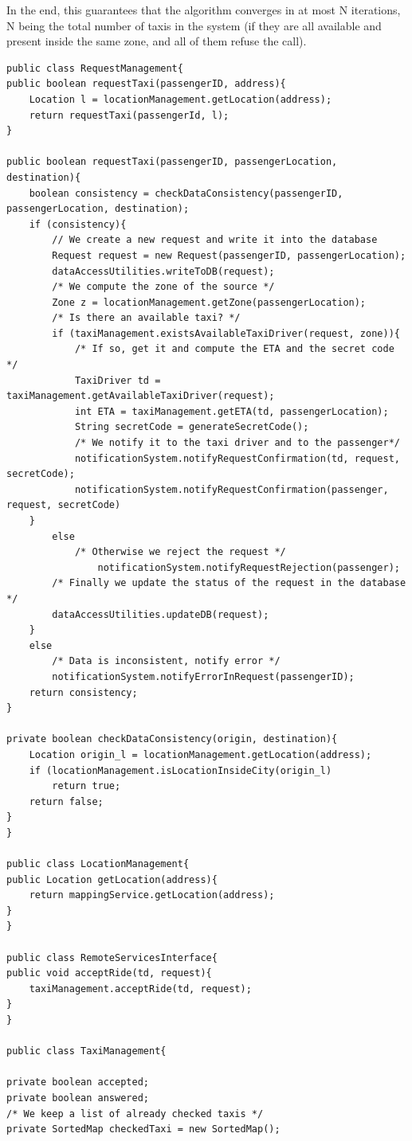 In the end, this guarantees that the algorithm converges in at most N iterations, N being the total number of taxis in the system (if they are all available and present inside the same zone, and all of them refuse the call). 

\begin{lstlisting}
public class RequestManagement{ 
public boolean requestTaxi(passengerID, address){
	Location l = locationManagement.getLocation(address);
	return requestTaxi(passengerId, l);
}

public boolean requestTaxi(passengerID, passengerLocation, destination){
	boolean consistency = checkDataConsistency(passengerID, passengerLocation, destination);
	if (consistency){
		// We create a new request and write it into the database 
		Request request = new Request(passengerID, passengerLocation);
		dataAccessUtilities.writeToDB(request);
		/* We compute the zone of the source */
		Zone z = locationManagement.getZone(passengerLocation);
		/* Is there an available taxi? */
		if (taxiManagement.existsAvailableTaxiDriver(request, zone)){
			/* If so, get it and compute the ETA and the secret code */
			TaxiDriver td = taxiManagement.getAvailableTaxiDriver(request);
			int ETA = taxiManagement.getETA(td, passengerLocation);
			String secretCode = generateSecretCode();
			/* We notify it to the taxi driver and to the passenger*/
			notificationSystem.notifyRequestConfirmation(td, request, secretCode);
			notificationSystem.notifyRequestConfirmation(passenger, request, secretCode)
	}
		else
			/* Otherwise we reject the request */
				notificationSystem.notifyRequestRejection(passenger);
		/* Finally we update the status of the request in the database */
		dataAccessUtilities.updateDB(request);	
	}
	else
		/* Data is inconsistent, notify error */
		notificationSystem.notifyErrorInRequest(passengerID);
	return consistency;
}

private boolean checkDataConsistency(origin, destination){
	Location origin_l = locationManagement.getLocation(address);
	if (locationManagement.isLocationInsideCity(origin_l) 
		return true;
	return false; 
}
}

public class LocationManagement{
public Location getLocation(address){
	return mappingService.getLocation(address);
}
}

public class RemoteServicesInterface{
public void acceptRide(td, request){
	taxiManagement.acceptRide(td, request);
}
}

public class TaxiManagement{

private boolean accepted;
private boolean answered;
/* We keep a list of already checked taxis */
private SortedMap checkedTaxi = new SortedMap();


\end{lstlisting}
